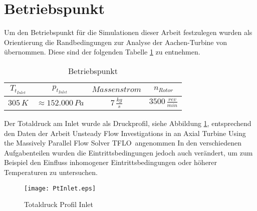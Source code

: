 \section{Betriebspunkt}
\label{subsec:aachensetup}
Um den Betriebspunkt für die Simulationen dieser Arbeit festzulegen wurden als Orientierung die Randbedingungen zur Analyse der Aachen-Turbine von 
\cite{ufi2001YaoDavis}
übernommen. Diese sind der folgenden Tabelle \ref{tab:aachensetup} zu entnehmen.
\begin{table}[H]
\centering
\caption{Betriebspunkt} \label{tab:aachensetup}
\begin{tabular}{ c| c| c| c}
$T_{t_{Inlet}}$&$p_{t_{Inlet}}$&$Massenstrom$&$n_{Rotor}$\\
\hline
$305 \, K$&$\approx152.000 \, Pa$&$7 \, \frac{kg}{s}$&$3500 \, \frac{rev}{min}$\\
\end{tabular}
\end{table}
Der Totaldruck am Inlet wurde als Druckprofil, siehe Abbildung \ref{fig:ptinlet}, entsprechend den Daten der Arbeit \glqq Unsteady Flow Investigations in an
Axial Turbine Using the Massively
Parallel Flow Solver TFLO\grqq \, \cite[p. 4]{ufi2001YaoDavis} angenommen
In den verschiedenen Aufgabenteilen wurden die Eintrittsbedingungen jedoch auch verändert, um zum Beispiel den Einfluss inhomogener Eintrittsbedingungen oder höherer Temperaturen zu untersuchen.

\begin{figure}[htbp]
	\centering
	\texttt{[image: PtInlet.eps]}
	\caption{Totaldruck Profil Inlet} \label{fig:ptinlet}
\end{figure}







